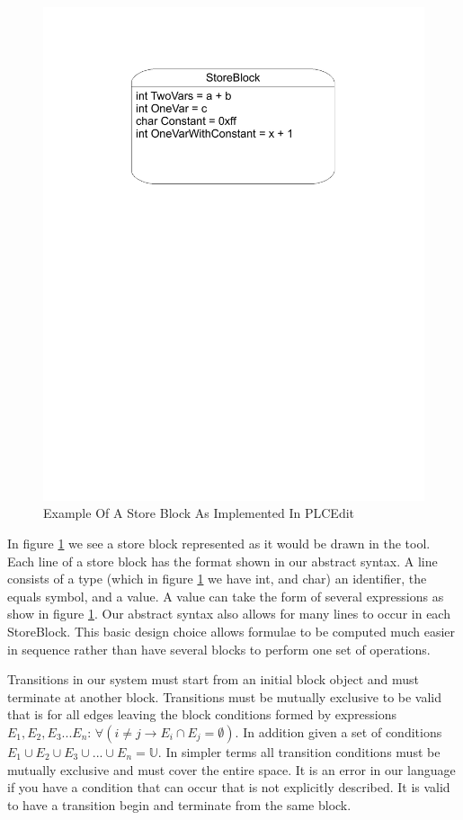 \begin{figure}[htp]
    \centering
    \includegraphics[trim= 20mm 175mm 20mm 10mm, clip, width=\imgmedium]{./images/state_storeblock.pdf}
    \caption{Example Of A Store Block As Implemented In PLCEdit}
    \label{fig:state_storeblock}
\end{figure}

In figure \ref{fig:state_storeblock} we see a store block represented as it would be drawn in the tool. Each line of a store block has the format shown in our abstract syntax. A line consists of a type (which in figure \ref{fig:state_storeblock} we have int, and char) an identifier, the equals symbol, and a value. A value can take the form of several expressions as show in figure \ref{fig:state_storeblock}. Our abstract syntax also allows for many lines to occur in each StoreBlock. This basic design choice allows formulae to be computed much easier in sequence rather than have several blocks to perform one set of operations.

Transitions in our system must start from an initial block object and must terminate at another block. Transitions must be mutually exclusive to be valid that is for all edges leaving the block conditions formed by expressions $E_1, E_2, E_3...E_n$: $\forall(i \neq j \rightarrow E_i \cap E_j = \emptyset)$. In addition given a set of conditions $E_1 \cup E_2 \cup E_3 \cup ... \cup E_n = \mathbb{U}$. In simpler terms all transition conditions must be mutually exclusive and must cover the entire space. It is an error in our language if you have a condition that can occur that is not explicitly described. It is valid to have a transition begin and terminate from the same block. 

